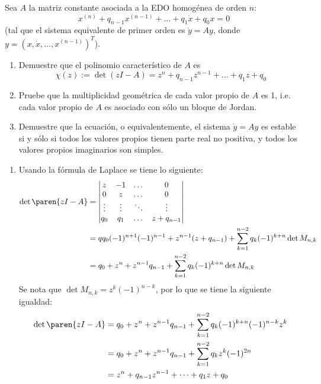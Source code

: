 \documentclass{homework}
\begin{document}
\begin{prob}
    Sea \(A\) la matriz constante asociada a la EDO homogénea de orden \(n\):
    \[x^{(n)}+q_{n-1}x^{(n-1)}+\dots+q_1\dot{x}+q_0x=0\]
    (tal que el sistema equivalente de primer orden es \(\dot{y}=Ay\), donde \(y=(x,\dot{x},\dots,x^{(n-1)})^T\)).
    \begin{enumerate}[label=(\alph*)]
        \item Demuestre que el polinomio característico de \(A\) es
        \[\chi(z):=\det(zI-A)=z^n+q_{n-1}z^{n-1}+\dots+q_1z+q_0\]
        \item Pruebe que la multiplicidad geométrica de cada valor propio de \(A\) es 1, i.e. cada valor propio de \(A\) es asociado con sólo un bloque de Jordan.
        \item Demuestre que la ecuación, o equivalentemente, el sistema \(\dot{y}=Ay\) es estable si y sólo si todos los valores propios tienen parte real no positiva, y todos los valores propios imaginarios son simples.
    \end{enumerate}
\end{prob}

\begin{sol}
    \begin{enumerate}[label=(\alph*)]
        \item Usando la fórmula de Laplace se tiene lo siguiente:
        \begin{align*}
            \det\paren{zI-A}&=\begin{vmatrix}
                z&-1&\dots&0\\
                0&z&\dots&0\\
                \vdots&\vdots&\ddots&\vdots\\
                q_{0}&q_{1}&\dots&z+q_{n-1}
            \end{vmatrix}\\
            &=qq_0(-1)^{n+1}(-1)^{n-1}+z^{n-1}(z+q_{n-1})+\sum_{k=1}^{n-2}q_k(-1)^{k+n}\det{M_{n,k}}\\
            &=q_0+z^n+z^{n-1}q_{n-1}+\sum_{k=1}^{n-2}q_k(-1)^{k+n}\det M_{n,k}
        \end{align*}
        Se nota que \(\det M_{n,k}=z^k(-1)^{n-k}\), por lo que se tiene la siguiente igualdad:
        \begin{align*}
            \det\paren{zI-A}&=q_0+z^n+z^{n-1}q_{n-1}+\sum_{k=1}^{n-2}q_k(-1)^{k+n}(-1)^{n-k}z^k\\
            &=q_0+z^n+z^{n-1}q_{n-1}+\sum_{k=1}^{n-2}q_kz^k(-1)^{2n}\\
            &=z^n+q_{n-1}z^{n-1}+\dots+q_1z+q_0
        \end{align*}
    \end{enumerate}
\end{sol}
\end{document}
